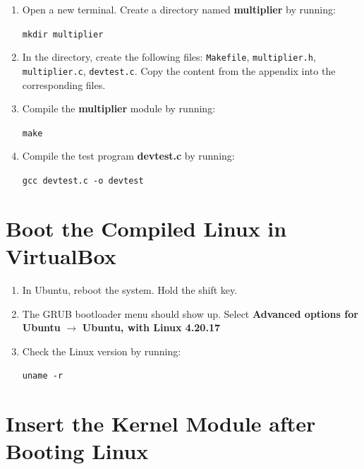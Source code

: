 \documentclass[11pt,letterpaper,titlepage]{article}
\begin{document}
\begin{enumerate}
    
    \item Open a new terminal. Create a directory named \textbf{multiplier} by running:
    
    \texttt{mkdir multiplier}
    
    \item In the directory, create the following files: \texttt{Makefile}, \texttt{multiplier.h}, \texttt{multiplier.c}, \texttt{devtest.c}. Copy the content from the appendix into the corresponding files.
    
    \item Compile the \textbf{multiplier} module by running:
    
    \texttt{make}
    
    \item Compile the test program \textbf{devtest.c} by running:
    
    \texttt{gcc devtest.c -o devtest}
    
\end{enumerate}

\section{Boot the Compiled Linux in VirtualBox}

\begin{enumerate}
    
    \item In Ubuntu, reboot the system. Hold the shift key.
    
    \item The GRUB bootloader menu should show up. Select \textbf{Advanced options for Ubuntu} $\rightarrow$ \textbf{Ubuntu, with Linux 4.20.17}
    
    \item Check the Linux version by running:
    
    \texttt{uname -r}
    
\end{enumerate}

\section{Insert the Kernel Module after Booting Linux}
\end{document}
